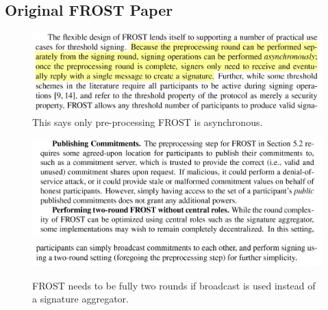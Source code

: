 \newpage

\subsection{Original FROST Paper}

\begin{figure}
    \centering
    \includegraphics[width=1\linewidth]{images/FROST_async.png}
    \caption{This says only pre-processing FROST is asynchronous.}
\end{figure}

\begin{figure}
    \centering
    \includegraphics[width=1\linewidth]{images/FROST_aggregator.png}
    \includegraphics[width=1\linewidth]{images/FROST_aggregator2.png}
    \caption{FROST needs to be fully two rounds if broadcast is used instead of a signature aggregator.}
\end{figure}




